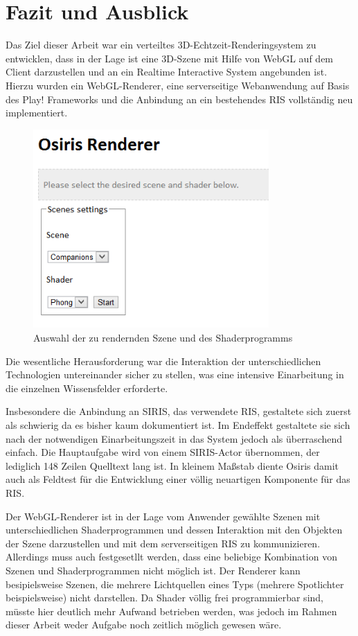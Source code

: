 \chapter{Fazit und Ausblick}
Das Ziel dieser Arbeit war ein verteiltes 3D-Echtzeit-Renderingsystem zu entwicklen, dass in der Lage ist eine 3D-Szene mit Hilfe von WebGL auf dem Client darzustellen und an ein Realtime Interactive System angebunden ist. Hierzu wurden ein WebGL-Renderer, eine serverseitige Webanwendung auf Basis des Play! Frameworks und die Anbindung an ein bestehendes RIS vollständig neu implementiert.
\begin{figure}
\centering
\includegraphics[width=90mm]{bilder/osirissettings.png}
\caption{Auswahl der zu rendernden Szene und des Shaderprogramms}
\label{fig:osirissettings}
\end{figure}

Die wesentliche Herausforderung war die Interaktion der unterschiedlichen Technologien untereinander sicher zu stellen, was eine intensive Einarbeitung in die einzelnen Wissensfelder erforderte.

Insbesondere die Anbindung an SIRIS, das verwendete RIS, gestaltete sich zuerst als schwierig da es bisher kaum dokumentiert ist. Im Endeffekt gestaltete sie sich nach der notwendigen Einarbeitungszeit in das System jedoch als überraschend einfach. Die Hauptaufgabe wird von einem SIRIS-Actor übernommen, der lediglich 148 Zeilen Quelltext lang ist. In kleinem Maßstab diente Osiris damit auch als Feldtest für die Entwicklung einer völlig neuartigen Komponente für das RIS.

Der WebGL-Renderer ist in der Lage vom Anwender gewählte Szenen mit unterschiedlichen Shaderprogrammen und dessen Interaktion mit den Objekten der Szene darzustellen und mit dem serverseitigen RIS zu kommunizieren. Allerdings muss auch festgesetllt werden, dass eine beliebige Kombination von Szenen und Shaderprogrammen nicht möglich ist. Der Renderer kann besipielsweise Szenen, die mehrere Lichtquellen eines Typs (mehrere Spotlichter beispielsweise) nicht darstellen. Da Shader völlig frei programmierbar sind, müsste hier deutlich mehr Aufwand betrieben werden, was jedoch im Rahmen dieser Arbeit weder Aufgabe noch zeitlich möglich gewesen wäre.

